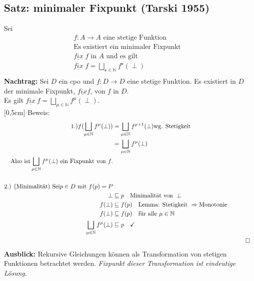 \begin{compactitem}
\subsection{Satz: minimaler Fixpunkt (Tarski 1955)}
Sei
\begin{align*}
f: A \rightarrow A \text{ eine stetige Funktion} \\ 
\text{Es existiert ein minimaler Fixpunkt}\\
\underline{fix}\; f \text{ in } A \text { und es gilt}\\
\underline{fix}\; f = \bigsqcup_{\mathcal{v} \in \mathbb{N}} f^\mathcal{v}(\perp)\\
\end{align*}
\textbf{Nachtrag:} Sei $D$ ein cpo und $f:D \rightarrow D$ eine stetige Funktion. Es existiert in $D$ der minimale Fixpunkt, $\underline{fix} f$, von $f$ in $D$.\\
Es gilt $\underline{fix}\ f = \bigsqcup_{\mu \in \mathbb{N}} f^\mu (\perp)$.\\
[0,5cm]
Beweis:\\
\begin{align*}
\text{1.)} f(\bigsqcup_{\mu \in \mathbb{N}} f^\mu (\perp)) &= \bigsqcup_{\mu \in \mathbb{N}} f^{\mu +1 }(\perp) \text{wg. Stetigkeit}\\
&= \bigsqcup_{\mu \in \mathbb{N}} f^{\mu}(\perp)\\
\text{Also ist} \bigsqcup_{\mu \in \mathbb{N}} f^{\mu}(\perp) \text{ ein Fixpunkt von } f.\\
\\
\text{2.) (Minimalität) Sei} p \in D \text{ mit } f(p) = P\\
\perp  &\sqsubseteq p \quad \text{Minimalität von } \perp \\
f(\perp)  &\sqsubseteq f(p) \quad \text{Lemma: Stetigkeit } \Rightarrow \text{Monotonie}\\
f(\perp)  &\sqsubseteq f(p) \quad \text{für alle } \mu \in \mathbb{N}\\
\bigsqcup_{\mu \in \mathbb{N}} f^\mu (\perp)  &\sqsubseteq p \quad \checkmark \\
&&\qed \\
\end{align*}
\textbf{Ausblick:} Rekursive Gleichungen können als Transformation von stetigen Funktionen betrachtet werden. \emph{Fixpunkt dieser Transformation ist eindeutige Lösung.}

\end{compactitem}
